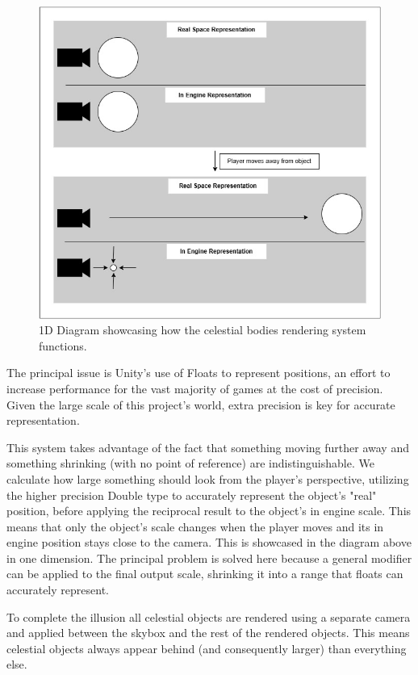 \documentclass{report}
\begin{document}
\begin{figure}[H]
	\centering
    \includegraphics[width=.9\textwidth]{celestialbodiesSystemDiagram.jpg}
    \caption{1D Diagram showcasing how the celestial bodies rendering system functions.}
\end{figure}

The principal issue is Unity's use of Floats to represent positions, an effort to increase performance for the vast majority of games at the cost of precision. Given the large scale of this project's world, extra precision is key for accurate representation. 

This system takes advantage of the fact that something moving further away and something shrinking (with no point of reference) are indistinguishable. We calculate how large something should look from the player's perspective, utilizing the higher precision Double type to accurately represent the object's "real" position, before applying the reciprocal result to the object's in engine scale. This means that only the object's scale changes when the player moves and its in engine position stays close to the camera. This is showcased in the diagram above in one dimension. The principal problem is solved here because a general modifier can be applied to the final output scale, shrinking it into a range that floats can accurately represent.

 To complete the illusion all celestial objects are rendered using a separate camera and applied between the skybox and the rest of the rendered objects. This means celestial objects always appear behind (and consequently larger) than everything else.
\end{document}
